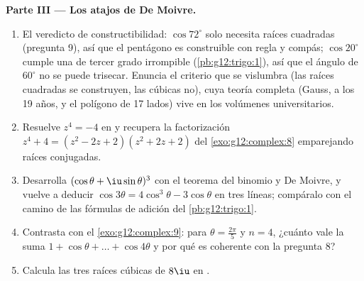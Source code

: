 \begin{problem}
\medskip
\noindent\textbf{Parte III --- Los atajos de De Moivre.}
\begin{enumerate}[resume]
  \item El veredicto de constructibilidad: $\cos 72^\circ$ solo necesita
        raíces cuadradas (pregunta 9), así que el pentágono es construible
        con regla y compás; $\cos 20^\circ$ cumple una  de tercer
        grado irrompible (\cref{pb:g12:trigo:1}), así que el ángulo de
        $60^\circ$ no se puede trisecar. Enuncia el criterio que se
        vislumbra (las raíces cuadradas se construyen, las cúbicas no), cuya
        teoría completa (Gauss, a los 19 años, y el polígono de 17 lados)
        vive en los volúmenes universitarios.
  \item Resuelve $z^4 = -4$ en  y recupera la
        factorización $z^4 + 4 = (z^2 - 2z + 2)(z^2 + 2z + 2)$ del
        \cref{exo:g12:complex:8} emparejando raíces conjugadas.
  \item Desarrolla $(\cos\theta + \iu\sin\theta)^3$ con el teorema del
        binomio y De Moivre, y vuelve a deducir
        $\cos 3\theta = 4\cos^3\theta - 3\cos\theta$ en tres líneas;
        compáralo con el camino de las fórmulas de adición del
        \cref{pb:g12:trigo:1}.
  \item Contrasta con el \cref{exo:g12:complex:9}: para
        $\theta = \frac{2\pi}{5}$ y $n = 4$, ¿cuánto vale la suma
        $1 + \cos\theta + \dots + \cos 4\theta$ y por qué es coherente con
        la pregunta 8?
  \item Calcula las tres raíces cúbicas de $8\iu$ en .
\end{enumerate}


\end{problem}
